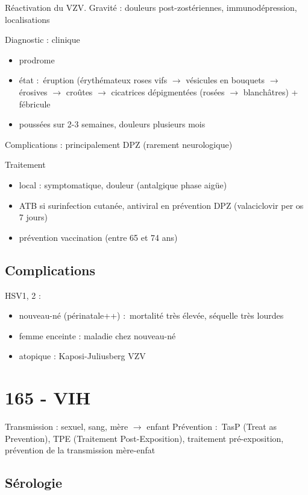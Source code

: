 Réactivation du VZV. Gravité : douleurs post-zostériennes,
immunodépression, localisations

Diagnostic : clinique

\begin{itemize}
\item prodrome
\item état :~éruption (érythémateux roses vifs $\to$ vésicules en
  bouquets $\to$ érosives $\to$ croûtes
  $\to$ cicatrices dépigmentées (rosées $\to$
  blanchâtres) + fébricule
\item poussées sur 2-3 semaines, douleurs plusieurs mois
\end{itemize}

Complications : principalement DPZ (rarement neurologique)

Traitement

\begin{itemize}
\item local : symptomatique, douleur (antalgique phase aigüe)
\item ATB si surinfection cutanée, antiviral en prévention DPZ (valaciclovir
  per os 7 jours)
\item prévention vaccination (entre 65 et 74 ans)
\end{itemize}

\subsection{Complications}

HSV1, 2 :

\begin{itemize}
\item nouveau-né (périnatale++) :~mortalité très élevée, séquelle
très lourdes 
\item femme enceinte : maladie chez nouveau-né 
\item atopique : Kaposi-Juliusberg VZV
\end{itemize}

\section{165 - VIH}

Transmission : sexuel, sang, mère $\to$ enfant Prévention
:~TasP (Treat as Prevention), TPE (Traitement Post-Exposition),
traitement pré-exposition, prévention de la transmission mère-enfat

\subsection{Sérologie}

